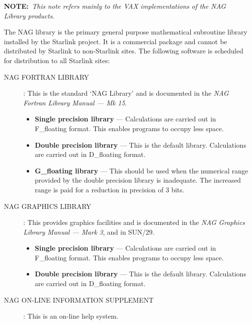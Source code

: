 {\bf NOTE:}~{\em This note refers mainly to the VAX implementations of the
NAG Library products}.

The NAG library is the primary general purpose mathematical subroutine library
installed by the Starlink project. It is a commercial package and cannot be
distributed by Starlink to non-Starlink sites. The following software is
scheduled for distribution to all Starlink sites:

\begin{description}

\item [NAG FORTRAN LIBRARY] : This is the standard `NAG Library' and is
documented in the {\em NAG Fortran Library Manual --- Mk 15}.

\begin{itemize}

\item {\bf Single precision library} --- Calculations are carried out in
F\_floating format. This enables programs to occupy less space.

\item {\bf Double precision library} --- This is the default library.
Calculations are carried out in D\_floating format.

\item {\bf G\_floating library} --- This should be used when the numerical
range provided by the double precision library is inadequate. The increased
range is paid for a reduction in precision of 3 bits.

\end{itemize}

\item [NAG GRAPHICS LIBRARY] : This provides graphics facilities and is
documented in the {\em NAG Graphics Library Manual --- Mark 3}, and in SUN/29.

\begin{itemize}

\item {\bf Single precision library} --- Calculations are carried out in
F\_floating format. This enables programs to occupy less space.

\item {\bf Double precision library} --- This is the default library.
Calculations are carried out in D\_floating format.

\end{itemize}

\item [NAG ON-LINE INFORMATION SUPPLEMENT] : This is an on-line help system.

\end{description}

